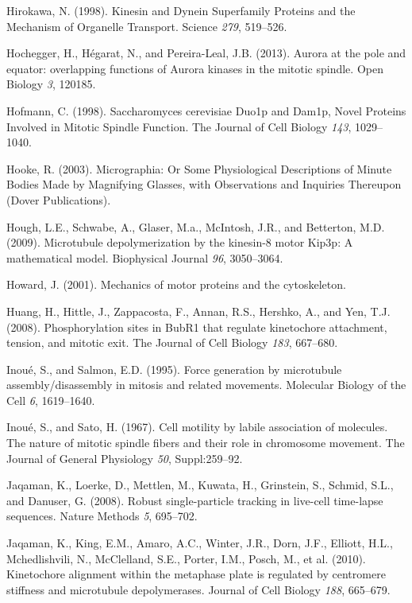 \documentclass[12pt,a4paper,twoside,openright]{book}
\begin{document}
\hypertarget{ref-Hirokawa1998}{}
Hirokawa, N. (1998). Kinesin and Dynein Superfamily Proteins and the
Mechanism of Organelle Transport. Science \emph{279}, 519--526.

\hypertarget{ref-Hochegger2013}{}
Hochegger, H., Hégarat, N., and Pereira-Leal, J.B. (2013). Aurora at the
pole and equator: overlapping functions of Aurora kinases in the mitotic
spindle. Open Biology \emph{3}, 120185.

\hypertarget{ref-Hofmann1998}{}
Hofmann, C. (1998). Saccharomyces cerevisiae Duo1p and Dam1p, Novel
Proteins Involved in Mitotic Spindle Function. The Journal of Cell
Biology \emph{143}, 1029--1040.

\hypertarget{ref-hooke2003micrographia}{}
Hooke, R. (2003). Micrographia: Or Some Physiological Descriptions of
Minute Bodies Made by Magnifying Glasses, with Observations and
Inquiries Thereupon (Dover Publications).

\hypertarget{ref-Hough2009}{}
Hough, L.E., Schwabe, A., Glaser, M.a., McIntosh, J.R., and Betterton,
M.D. (2009). Microtubule depolymerization by the kinesin-8 motor Kip3p:
A mathematical model. Biophysical Journal \emph{96}, 3050--3064.

\hypertarget{ref-Howard2001}{}
Howard, J. (2001). Mechanics of motor proteins and the cytoskeleton.

\hypertarget{ref-Huang2008}{}
Huang, H., Hittle, J., Zappacosta, F., Annan, R.S., Hershko, A., and
Yen, T.J. (2008). Phosphorylation sites in BubR1 that regulate
kinetochore attachment, tension, and mitotic exit. The Journal of Cell
Biology \emph{183}, 667--680.

\hypertarget{ref-Inoue1995}{}
Inoué, S., and Salmon, E.D. (1995). Force generation by microtubule
assembly/disassembly in mitosis and related movements. Molecular Biology
of the Cell \emph{6}, 1619--1640.

\hypertarget{ref-Inoue1967}{}
Inoué, S., and Sato, H. (1967). Cell motility by labile association of
molecules. The nature of mitotic spindle fibers and their role in
chromosome movement. The Journal of General Physiology \emph{50},
Suppl:259--92.

\hypertarget{ref-Jaqaman2008}{}
Jaqaman, K., Loerke, D., Mettlen, M., Kuwata, H., Grinstein, S., Schmid,
S.L., and Danuser, G. (2008). Robust single-particle tracking in
live-cell time-lapse sequences. Nature Methods \emph{5}, 695--702.

\hypertarget{ref-Jaqaman2010}{}
Jaqaman, K., King, E.M., Amaro, A.C., Winter, J.R., Dorn, J.F., Elliott,
H.L., Mchedlishvili, N., McClelland, S.E., Porter, I.M., Posch, M., et
al. (2010). Kinetochore alignment within the metaphase plate is
regulated by centromere stiffness and microtubule depolymerases. Journal
of Cell Biology \emph{188}, 665--679.
\end{document}
